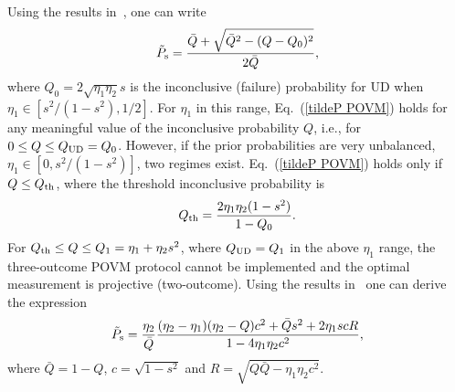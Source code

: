\documentclass[aps,pra,twocolumn,showpacs]{revtex4-1}
\begin{document}
Using the results  in~\cite{FRIO}, one can write
%
\begin{equation}
\tilde P_{\rm s}={\bar Q+\sqrt{\bar Q^2-(Q-Q_0)^2}\over2\bar Q},
\label{tildeP POVM}
\end{equation}
%
where 
$Q_0=2\sqrt{\eta_1\eta_2}s$ is the inconclusive (failure) probability for UD when $\eta_1\in[s^2/(1-s^2),1/2]$. For $\eta_1$ in this range, Eq.~(\ref{tildeP POVM}) holds for any meaningful value of the inconclusive probability $Q$, i.e., for $0\le Q\le Q_{\rm UD}=Q_0$. However, if the prior probabilities are very unbalanced, $\eta_1\in[0,s^2/(1-s^2)]$, two regimes exist. Eq.~(\ref{tildeP POVM}) holds only if $Q\le Q_{\rm th}$, where the threshold inconclusive probability is
%
\begin{equation}
Q_{\rm th}={2\eta_1\eta_2(1-s^2)\over 1-Q_0}.
\label{Q_th}
\end{equation}
%
For $Q_{\rm th}\le Q\le Q_{1}=\eta_1+\eta_2 s^2$, where $Q_{\rm UD}=Q_1$ in the above $\eta_1$ range, the three-outcome POVM protocol cannot be implemented and the optimal measurement is projective (two-outcome). Using the results in~\cite{FRIO} one can derive the expression 
%
\begin{equation}
\tilde P_{\rm s}={\eta_2\over\bar Q}{(\eta_2-\eta_1)(\eta_2-Q)c^2+\bar Q s^2+2\eta_1 sc R\over1-4\eta_1\eta_2c^2},
\label{tildeP proj}
\end{equation}
%
where $\bar Q=1-Q$, $c=\sqrt{1-s^2}$ and $R=\sqrt{Q\bar Q-\eta_1\eta_2 c^2}$. 
\end{document}
